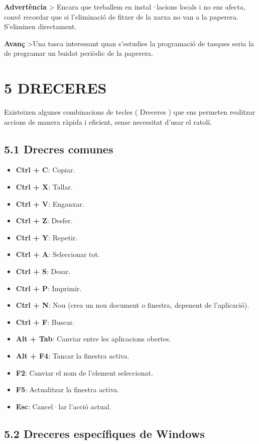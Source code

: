 \documentclass[
  a4paper,
]{article}
\providecommand{\tightlist}{%
  \setlength{\itemsep}{0pt}\setlength{\parskip}{0pt}}
\begin{document}
\textbf{Advertència} \textgreater{} Encara que treballem en
instal·lacions locals i no ens afecta, convé recordar que si
l'eliminació de fitxer de la xarxa no van a la paperera. S'eliminen
directament.

\textbf{Avanç} \textgreater Una tasca interessant quan s'estudies la
programació de tasques seria la de programar un buidat periòdic de la
paperera.

\section{5 DRECERES}\label{dreceres}

Existeixen algunes combinacions de tecles ( Dreceres ) que ens permeten
realitzar accions de manera ràpida i eficient, sense necessitat d'usar
el ratolí.

\subsection{5.1 Drecres comunes}\label{drecres-comunes}

\begin{itemize}
\tightlist
\item
  \textbf{Ctrl + C}: Copiar.
\item
  \textbf{Ctrl + X}: Tallar.
\item
  \textbf{Ctrl + V}: Enganxar.
\item
  \textbf{Ctrl + Z}: Desfer.
\item
  \textbf{Ctrl + Y}: Repetir.
\item
  \textbf{Ctrl + A}: Seleccionar tot.
\item
  \textbf{Ctrl + S}: Desar.
\item
  \textbf{Ctrl + P}: Imprimir.
\item
  \textbf{Ctrl + N}: Nou (crea un nou document o finestra, depenent de
  l'aplicació).
\item
  \textbf{Ctrl + F}: Buscar.
\item
  \textbf{Alt + Tab}: Canviar entre les aplicacions obertes.
\item
  \textbf{Alt + F4}: Tancar la finestra activa.
\item
  \textbf{F2}: Canviar el nom de l'element seleccionat.
\item
  \textbf{F5}: Actualitzar la finestra activa.
\item
  \textbf{Esc}: Cancel·lar l'acció actual.
\end{itemize}

\subsection{5.2 Dreceres específiques de
Windows}\label{dreceres-especuxedfiques-de-windows}
\end{document}
